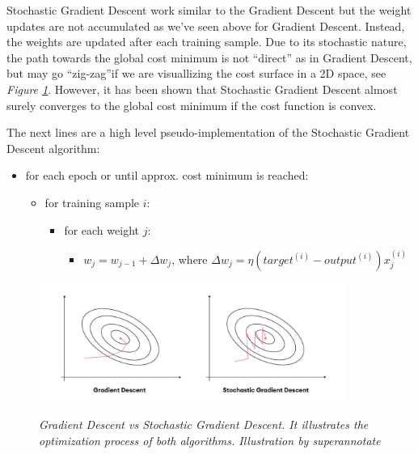Stochastic Gradient Descent work similar to the Gradient Descent but the weight updates are not accumulated as we’ve seen above for Gradient Descent. Instead, the weights are updated after each training sample. Due to its stochastic nature, the path towards the global cost minimum is not “direct” as in Gradient Descent, but may go “zig-zag”if we are visuallizing the cost surface in a 2D space, see \textit{Figure \ref{fig:sgdvsgd}}. However, it has been shown that Stochastic Gradient Descent almost surely converges to the global cost minimum if the cost function is convex. \\

\newpage

The next lines are a high level pseudo-implementation of the Stochastic Gradient Descent algorithm:

\begin{itemize}[label=$\circ$]
    \item for each epoch or until approx. cost minimum is reached:
        \begin{itemize}[label=$\circ$, topsep=0pt]
            \item for training sample \(i\):
              \begin{itemize}[label=$\circ$, topsep=5pt]
                \item for each weight \(j\):
                    \begin{itemize}[label=$\circ$, topsep=10pt]
                        \item \(w_j = w_{j-1} + \Delta w_j\), where \(\Delta w_j = \eta (target^{(i)} - output^{(i)})x_{j}^{(i)}\) 
                    \end{itemize}
            \end{itemize}
        \end{itemize}
\end{itemize}

\begin{figure}[H]
\centering
\begin{adjustbox}{trim=0cm 0cm 0cm 1cm, clip}
\includegraphics[width=0.9\textwidth]{imatges/preliminaries/sgdvsgd.jpeg}
\end{adjustbox}
    \caption[Gradient Descent vs Stochastic Gradient Descent]{\textit{Gradient Descent vs Stochastic Gradient Descent. It illustrates the optimization process of both algorithms. Illustration by superannotate}}
{\label{fig:sgdvsgd}}
\end{figure}

